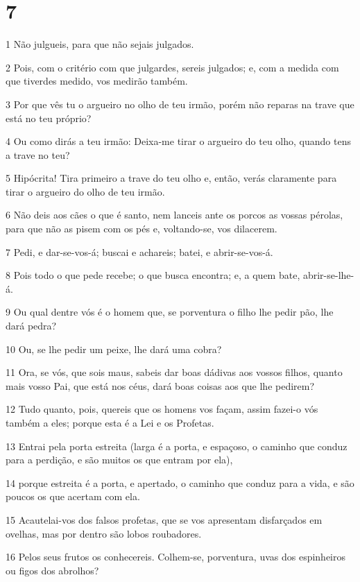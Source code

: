 \chapter{7}

\par 1 Não julgueis, para que não sejais julgados.
\par 2 Pois, com o critério com que julgardes, sereis julgados; e, com a medida com que tiverdes medido, vos medirão também.
\par 3 Por que vês tu o argueiro no olho de teu irmão, porém não reparas na trave que está no teu próprio?
\par 4 Ou como dirás a teu irmão: Deixa-me tirar o argueiro do teu olho, quando tens a trave no teu?
\par 5 Hipócrita! Tira primeiro a trave do teu olho e, então, verás claramente para tirar o argueiro do olho de teu irmão.
\par 6 Não deis aos cães o que é santo, nem lanceis ante os porcos as vossas pérolas, para que não as pisem com os pés e, voltando-se, vos dilacerem.
\par 7 Pedi, e dar-se-vos-á; buscai e achareis; batei, e abrir-se-vos-á.
\par 8 Pois todo o que pede recebe; o que busca encontra; e, a quem bate, abrir-se-lhe-á.
\par 9 Ou qual dentre vós é o homem que, se porventura o filho lhe pedir pão, lhe dará pedra?
\par 10 Ou, se lhe pedir um peixe, lhe dará uma cobra?
\par 11 Ora, se vós, que sois maus, sabeis dar boas dádivas aos vossos filhos, quanto mais vosso Pai, que está nos céus, dará boas coisas aos que lhe pedirem?
\par 12 Tudo quanto, pois, quereis que os homens vos façam, assim fazei-o vós também a eles; porque esta é a Lei e os Profetas.
\par 13 Entrai pela porta estreita (larga é a porta, e espaçoso, o caminho que conduz para a perdição, e são muitos os que entram por ela),
\par 14 porque estreita é a porta, e apertado, o caminho que conduz para a vida, e são poucos os que acertam com ela.
\par 15 Acautelai-vos dos falsos profetas, que se vos apresentam disfarçados em ovelhas, mas por dentro são lobos roubadores.
\par 16 Pelos seus frutos os conhecereis. Colhem-se, porventura, uvas dos espinheiros ou figos dos abrolhos?
